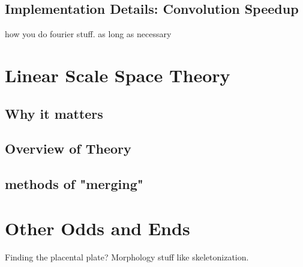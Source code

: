 	\subsection{Implementation Details: Convolution Speedup}
	how you do fourier stuff. as long as necessary
\section{Linear Scale Space Theory}
	\subsection{Why it matters}
	\subsection{Overview of Theory}
	\subsection{methods of "merging"}
\section{Other Odds and Ends} Finding the placental plate? Morphology stuff like skeletonization.



